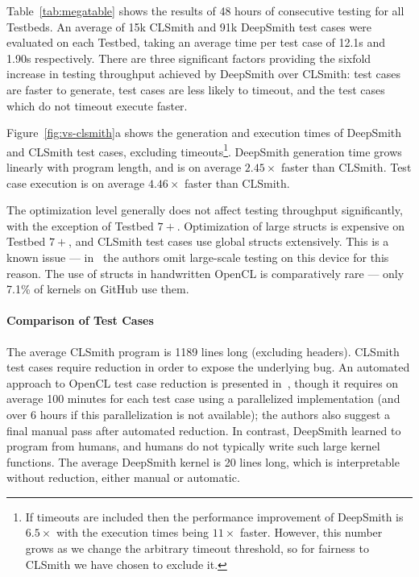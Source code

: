Table~\ref{tab:megatable} shows the results of 48 hours of consecutive testing for all Testbeds. An average of 15k CLSmith and 91k DeepSmith test cases were evaluated on each Testbed, taking an average time per test case of 12.1s and 1.90s respectively. There are three significant factors providing the sixfold increase in testing throughput achieved by DeepSmith over CLSmith: test cases are faster to generate, test cases are less likely to timeout, and the test cases which do not timeout execute faster.

Figure~\ref{fig:vs-clsmith}a shows the generation and execution times of DeepSmith and CLSmith test cases, excluding timeouts\footnote{If timeouts are included then the performance improvement of DeepSmith is $6.5\times$ with the execution times being $11\times$ faster. However, this number grows as we change the arbitrary timeout threshold, so for fairness to CLSmith we have chosen to exclude it.}. DeepSmith generation time grows linearly with program length, and is on average $2.45\times$ faster than CLSmith. Test case execution is on average $4.46\times$ faster than CLSmith.

The optimization level generally does not affect testing throughput significantly, with the exception of Testbed $7+$. Optimization of large structs is expensive on Testbed $7+$, and CLSmith test cases use global structs extensively. This is a known issue --- in~\cite{Lidbury2015a} the authors omit large-scale testing on this device for this reason. The use of structs in handwritten OpenCL is comparatively rare --- only 7.1\% of kernels on GitHub use them.

\paragraph{Comparison of Test Cases} %
The average CLSmith program is 1189 lines long (excluding headers). CLSmith test cases require reduction in order to expose the underlying bug. An automated approach to OpenCL test case reduction is presented in~\cite{Pflanzer2016}, though it requires on average 100 minutes for each test case using a parallelized implementation (and over 6 hours if this parallelization is not available); the authors also suggest a final manual pass after automated reduction. In contrast, DeepSmith learned to program from humans, and humans do not typically write such large kernel functions. The average DeepSmith kernel is 20 lines long, which is interpretable without reduction, either manual or automatic. 

